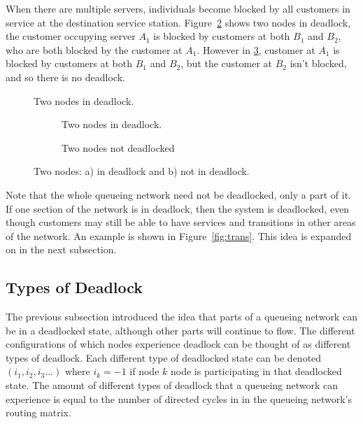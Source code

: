 \documentclass{article}
\begin{document}
When there are multiple servers, individuals become blocked by all customers in
service at the destination service station.
Figure~\ref{fig:inout_deadlock_in} shows two nodes in deadlock, the customer occupying server $A_1$ is blocked by customers at both $B_1$ and $B_2$, who are both blocked by the customer at $A_1$.
However in \ref{fig:inout_deadlock_out}, customer at $A_1$ is blocked by customers at both $B_1$ and $B_2$, but the customer at $B_2$ isn't blocked, and so there is no deadlock.

\begin{figure}[H]
  \begin{center}
  
  \caption{Two nodes in deadlock.}
  \label{fig:2in_deadlock}
  \end{center}
\end{figure}

\begin{figure}[H]
\begin{subfigure}[b]{0.5\textwidth}
  
  \caption{Two nodes in deadlock.}
  \label{fig:inout_deadlock_in}
\end{subfigure}
\begin{subfigure}[b]{0.5\textwidth}
  
  \caption{Two nodes not deadlocked}
  \label{fig:inout_deadlock_out}
\end{subfigure}
\caption{Two nodes: a) in deadlock and b) not in deadlock.}
\label{fig:inout_deadlock}
\end{figure}

Note that the whole queueing network need not be deadlocked, only a part of it.
If one section of the network is in deadlock, then the system is deadlocked, even though customers may still be able to have services and transitions in other areas of the network.
An example is shown in Figure~\ref{fig:trans}.
This idea is expanded on in the next subsection.

\subsection{Types of Deadlock}
The previous subsection introduced the idea that parts of a queueing network can be in a deadlocked state, although other parts will continue to flow.
The different configurations of which nodes experience deadlock can be thought
of as different types of deadlock.
Each different type of deadlocked state can be denoted $(i_1, i_2, i_3...)$ where $i_k = -1$ if node $k$ node is participating in that deadlocked state.
The amount of different types of deadlock that a queueing network can experience
is equal to the number of directed cycles in in the queueing network's routing
matrix. %
\end{document}
